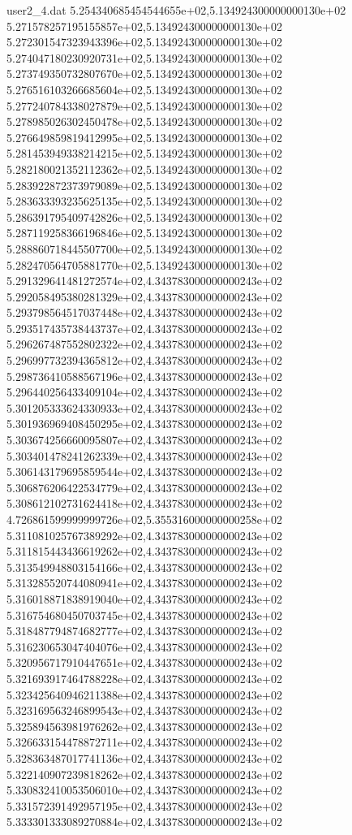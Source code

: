 \begin{filecontents}{user2_4.dat}
5.254340685454544655e+02,5.134924300000000130e+02
5.271578257195155857e+02,5.134924300000000130e+02
5.272301547323943396e+02,5.134924300000000130e+02
5.274047180230920731e+02,5.134924300000000130e+02
5.273749350732807670e+02,5.134924300000000130e+02
5.276516103266685604e+02,5.134924300000000130e+02
5.277240784338027879e+02,5.134924300000000130e+02
5.278985026302450478e+02,5.134924300000000130e+02
5.276649859819412995e+02,5.134924300000000130e+02
5.281453949338214215e+02,5.134924300000000130e+02
5.282180021352112362e+02,5.134924300000000130e+02
5.283922872373979089e+02,5.134924300000000130e+02
5.283633393235625135e+02,5.134924300000000130e+02
5.286391795409742826e+02,5.134924300000000130e+02
5.287119258366196846e+02,5.134924300000000130e+02
5.288860718445507700e+02,5.134924300000000130e+02
5.282470564705881770e+02,5.134924300000000130e+02
5.291329641481272574e+02,4.343783000000000243e+02
5.292058495380281329e+02,4.343783000000000243e+02
5.293798564517037448e+02,4.343783000000000243e+02
5.293517435738443737e+02,4.343783000000000243e+02
5.296267487552802322e+02,4.343783000000000243e+02
5.296997732394365812e+02,4.343783000000000243e+02
5.298736410588567196e+02,4.343783000000000243e+02
5.296440256433409104e+02,4.343783000000000243e+02
5.301205333624330933e+02,4.343783000000000243e+02
5.301936969408450295e+02,4.343783000000000243e+02
5.303674256660095807e+02,4.343783000000000243e+02
5.303401478241262339e+02,4.343783000000000243e+02
5.306143179695859544e+02,4.343783000000000243e+02
5.306876206422534779e+02,4.343783000000000243e+02
5.308612102731624418e+02,4.343783000000000243e+02
4.726861599999999726e+02,5.355316000000000258e+02
5.311081025767389292e+02,4.343783000000000243e+02
5.311815443436619262e+02,4.343783000000000243e+02
5.313549948803154166e+02,4.343783000000000243e+02
5.313285520744080941e+02,4.343783000000000243e+02
5.316018871838919040e+02,4.343783000000000243e+02
5.316754680450703745e+02,4.343783000000000243e+02
5.318487794874682777e+02,4.343783000000000243e+02
5.316230653047404076e+02,4.343783000000000243e+02
5.320956717910447651e+02,4.343783000000000243e+02
5.321693917464788228e+02,4.343783000000000243e+02
5.323425640946211388e+02,4.343783000000000243e+02
5.323169563246899543e+02,4.343783000000000243e+02
5.325894563981976262e+02,4.343783000000000243e+02
5.326633154478872711e+02,4.343783000000000243e+02
5.328363487017741136e+02,4.343783000000000243e+02
5.322140907239818262e+02,4.343783000000000243e+02
5.330832410053506010e+02,4.343783000000000243e+02
5.331572391492957195e+02,4.343783000000000243e+02
5.333301333089270884e+02,4.343783000000000243e+02

\end{filecontents}
